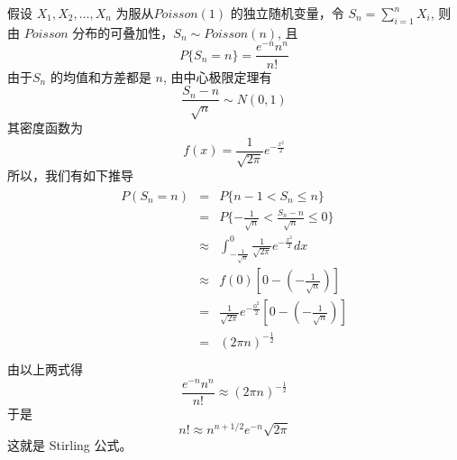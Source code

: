 假设 $X_1, X_2,\ldots, X_n$ 为服从$Poisson(1)$ 的独立随机变量，令 $S_n=\sum_{i=1}^n
X_i$, 则由 $Poisson$ 分布的可叠加性，$S_n \sim Poisson(n)$, 且
\begin{equation}
P\{ {S_n} = n\}  = \frac{{{e^{ - n}}{n^n}}}{{n!}}
\end{equation}
由于$S_n$ 的均值和方差都是 $n$, 由中心极限定理有 
$$ \frac{S_n - n}{{\sqrt n }} \sim N(0,1) $$
其密度函数为
$$ \displaystyle f(x)=\frac{1}{\sqrt{2\pi}}e^{-\frac{x^2}{2}} $$
所以，我们有如下推导
\begin{eqnarray}
\begin{array}{lll}
 P({S_n} = n) & = & \displaystyle P\{ n - 1 < {S_n} \le n\}  \\ 
              & = & \displaystyle P\{  - \frac{1}{{\sqrt n }} < \frac{{{S_n} - n}}{{\sqrt n }} \le 0\}  \\ 
 & \approx & \displaystyle \int_{ - \frac{1}{{\sqrt n }}}^0 {\frac{1}{\sqrt{2\pi}}{e^{ - \frac{{{x^2}}}{2}}}dx}  \\ 
 & \approx & f(0) [0 - ( - \frac{1}{{\sqrt n }})] \\
 & = & \displaystyle {\frac{1}{\sqrt{2\pi}}}{e^{ - \frac{{{0^2}}}{2}}}[0 - ( - \frac{1}{{\sqrt n }})] \\

 & = & \displaystyle {(2\pi n)^{ - \frac{1}{2}}} \\ 
\end{array}
\end{eqnarray}
由以上两式得
$$ \frac{{{e^{ - n}}{n^n}}}{{n!}} \approx {(2\pi n)^{ - \frac{1}{2}}} $$
于是
$$ n! \approx {n^{n + 1/2}}{e^{ - n}}\sqrt {2\pi } $$
这就是 Stirling 公式。
